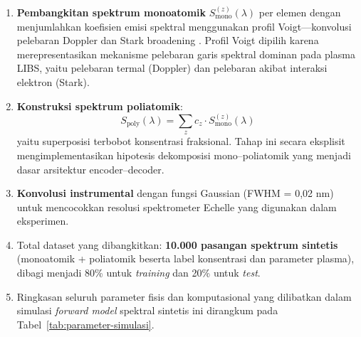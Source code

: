 \documentclass[12pt, a4paper]{article}
\begin{document}
\begin{enumerate}[label=\arabic*., leftmargin=2cm]
    \item \textbf{Pembangkitan spektrum monoatomik} $S_\mathrm{mono}^{(z)}(\lambda)$ per elemen dengan menjumlahkan koefisien emisi spektral menggunakan profil Voigt---konvolusi pelebaran Doppler dan Stark broadening \cite{griem1974}. Profil Voigt dipilih karena merepresentasikan mekanisme pelebaran garis spektral dominan pada plasma LIBS, yaitu pelebaran termal (Doppler) dan pelebaran akibat interaksi elektron (Stark).

    \item \textbf{Konstruksi spektrum poliatomik}:
    \begin{equation}
        S_\mathrm{poly}(\lambda) = \sum_{z} c_z \cdot S_\mathrm{mono}^{(z)}(\lambda)
    \end{equation}
    yaitu superposisi terbobot konsentrasi fraksional. Tahap ini secara eksplisit mengimplementasikan hipotesis dekomposisi mono--poliatomik yang menjadi dasar arsitektur encoder--decoder.

    \item \textbf{Konvolusi instrumental} dengan fungsi Gaussian (FWHM = 0{,}02 nm) untuk mencocokkan resolusi spektrometer Echelle yang digunakan dalam eksperimen.

    \item Total dataset yang dibangkitkan: \textbf{10.000 pasangan spektrum sintetis} (monoatomik + poliatomik beserta label konsentrasi dan parameter plasma), dibagi menjadi 80\% untuk \textit{training} dan 20\% untuk \textit{test}.
    \item Ringkasan seluruh parameter fisis dan komputasional yang dilibatkan dalam simulasi \textit{forward model} spektral sintetis ini dirangkum pada Tabel~\ref{tab:parameter-simulasi}.
\end{enumerate}
\end{document}
